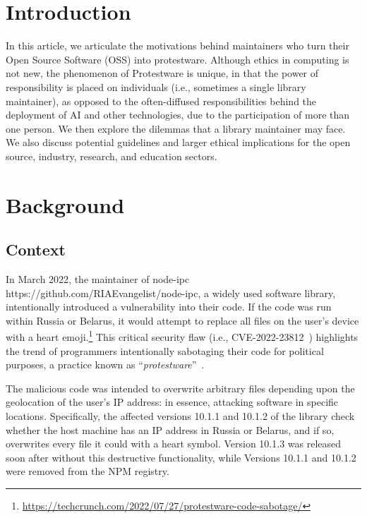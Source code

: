 \documentclass[journal,twocolumn]{IEEEtran}
\begin{document}
\section{Introduction}
In this article, we articulate the motivations behind maintainers who turn their Open Source Software (OSS) into protestware.
Although ethics in computing is not new, the phenomenon of Protestware is unique, in that the power of responsibility is placed on individuals (i.e., sometimes a single library maintainer), as opposed to the often-diffused responsibilities behind the deployment of AI and other technologies, due to the participation of more than one person.
We then explore the dilemmas that a library maintainer may face.
We also discuss potential guidelines and larger ethical implications for the open source, industry, research, and education sectors.

\section{Background}
\label{sec:background}
\subsection{Context}
\label{sec:context}

In March 2022, the maintainer of node-ipc https://github.com/RIAEvangelist/node-ipc, a widely used software library, intentionally introduced a vulnerability into their code. If the code was run within Russia or Belarus, it would attempt to replace all files on the user's device with a heart emoji.\footnote{\url{https://techcrunch.com/2022/07/27/protestware-code-sabotage/}} This critical security flaw (i.e., CVE-2022-23812~\cite{Web:CVE-2022-23812}) highlights the trend of programmers intentionally sabotaging their code for political purposes, a practice known as ``\textit{protestware}''~\cite{kula2022war}.

The malicious code was intended to overwrite arbitrary files depending upon the geolocation of the user's IP address: in essence, attacking software in specific locations.
Specifically, the affected versions 10.1.1 and 10.1.2 of the library check whether the host machine has an IP address in Russia or Belarus, and if so, overwrites every file it could with a heart symbol. 
Version 10.1.3 was released soon after without this destructive functionality, while Versions 10.1.1 and 10.1.2 were removed from the NPM registry.
\end{document}
